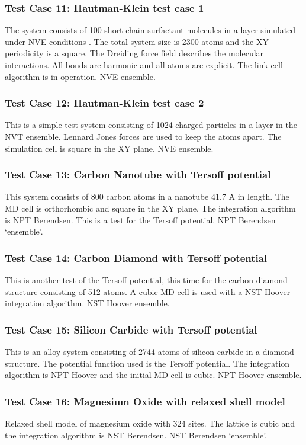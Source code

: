 \subsubsection{Test Case 11: Hautman-Klein test case 1}
The system consists of 100 short chain surfactant molecules in a layer
simulated under NVE conditions . The total system size is 2300 atoms and the
XY periodicity is a square. The Dreiding force field describes the molecular
interactions. All bonds are harmonic and all atoms are explicit. The link-cell
algorithm is in operation. NVE ensemble.

\subsubsection{Test Case 12: Hautman-Klein test case 2}
This is a simple test system consisting of 1024 charged particles in a
layer in the NVT ensemble. Lennard Jones forces are used to keep the
atoms apart. The simulation cell is square in the XY plane. NVE ensemble.

\subsubsection{Test Case 13: Carbon Nanotube with Tersoff potential}
This system consists of 800 carbon atoms in a nanotube 41.7 A in length. The
MD cell is orthorhombic and square in the XY plane. The integration algorithm
is NPT Berendsen. This is a test for the Tersoff potential. NPT Berendsen
`ensemble'.

\subsubsection{Test Case 14: Carbon Diamond with Tersoff potential}
This is another test of the Tersoff potential, this time for the carbon
diamond structure consisting of 512 atoms. A cubic MD cell is used with a NST
Hoover integration algorithm. NST Hoover ensemble.

\subsubsection{Test Case 15: Silicon Carbide with Tersoff potential}
This is an alloy system consisting of 2744 atoms of silicon carbide in a
diamond structure. The potential function used is the Tersoff potential. The
integration algorithm is NPT Hoover and the initial MD cell is cubic. NPT
Hoover ensemble.

\subsubsection{Test Case 16: Magnesium Oxide with relaxed shell model}
Relaxed shell model of magnesium oxide with 324 sites. The lattice is cubic
and the integration algorithm is NST Berendsen. NST Berendsen `ensemble'.

